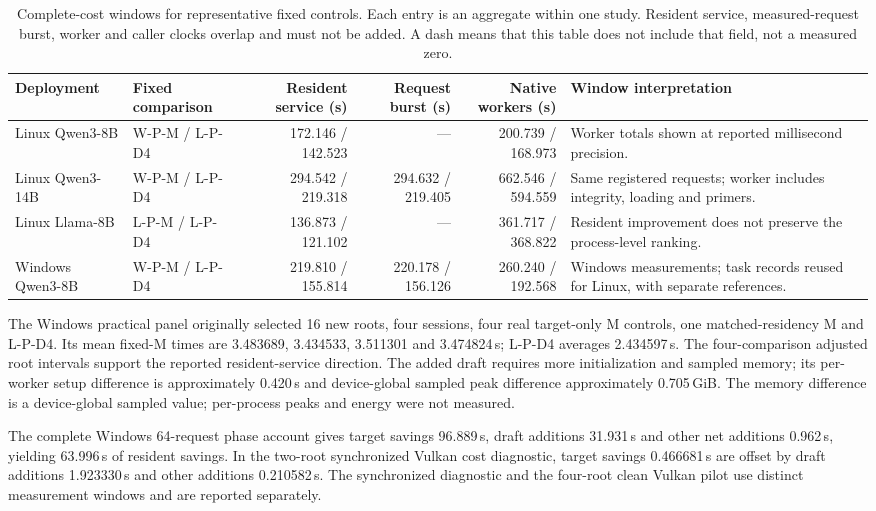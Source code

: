 \begin{table}[t]
\centering\footnotesize\tighttable
\caption{Complete-cost windows for representative fixed controls. Each entry is an aggregate within one study. Resident service, measured-request burst, worker and caller clocks overlap and must not be added. A dash means that this table does not include that field, not a measured zero.}
\label{tab:costs}
\begin{tabularx}{\textwidth}{@{}L{2.35cm}L{2.30cm}rrrY@{}}\toprule
Deployment & Fixed comparison & Resident service (s) & Request burst (s) & Native workers (s) & Window interpretation\\\midrule
Linux Qwen3-8B & W-P-M / L-P-D4 & 172.146 / 142.523 & --- & 200.739 / 168.973 & Worker totals shown at reported millisecond precision.\\
Linux Qwen3-14B & W-P-M / L-P-D4 & 294.542 / 219.318 & 294.632 / 219.405 & 662.546 / 594.559 & Same registered requests; worker includes integrity, loading and primers.\\
Linux Llama-8B & L-P-M / L-P-D4 & 136.873 / 121.102 & --- & 361.717 / 368.822 & Resident improvement does not preserve the process-level ranking.\\
Windows Qwen3-8B & W-P-M / L-P-D4 & 219.810 / 155.814 & 220.178 / 156.126 & 260.240 / 192.568 & Windows measurements; task records reused for Linux, with separate references.\\\bottomrule
\end{tabularx}
\end{table}

The Windows practical panel originally selected 16 new roots, four sessions, four real target-only M controls, one matched-residency M and L-P-D4. Its mean fixed-M times are 3.483689, 3.434533, 3.511301 and 3.474824\,s; L-P-D4 averages 2.434597\,s. The four-comparison adjusted root intervals support the reported resident-service direction. The added draft requires more initialization and sampled memory; its per-worker setup difference is approximately 0.420\,s and device-global sampled peak difference approximately 0.705\,GiB. The memory difference is a device-global sampled value; per-process peaks and energy were not measured.

The complete Windows 64-request phase account gives target savings 96.889\,s, draft additions 31.931\,s and other net additions 0.962\,s, yielding 63.996\,s of resident savings. In the two-root synchronized Vulkan cost diagnostic, target savings 0.466681\,s are offset by draft additions 1.923330\,s and other additions 0.210582\,s. The synchronized diagnostic and the four-root clean Vulkan pilot use distinct measurement windows and are reported separately.

